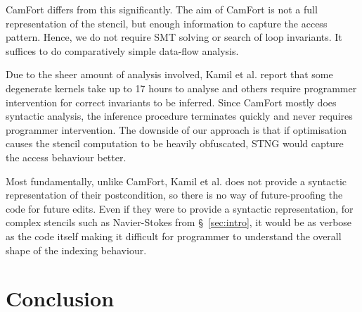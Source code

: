 \documentclass[10pt,preprint]{sigplanconf}
\theoremstyle{definition}
\begin{document}
CamFort differs from this significantly. The aim of CamFort is not a
full representation of the stencil, but enough information to capture the access
pattern. Hence, we do not require SMT solving or search of loop invariants. It
suffices to do comparatively simple data-flow analysis.

Due to the sheer amount of analysis involved, Kamil et al. report that some
degenerate kernels take up to 17 hours to analyse and others require programmer
intervention for correct invariants to be inferred. Since CamFort mostly does
syntactic analysis, the inference procedure terminates quickly and never requires programmer intervention. The downside of our
approach is that if optimisation causes the stencil computation to be heavily
obfuscated, \textsf{STNG} would capture the access behaviour better.

Most fundamentally, unlike CamFort, Kamil et al. does not provide a syntactic
representation of their postcondition, so there is no way of future-proofing the
code for future edits. Even if they were to provide a syntactic representation,
for complex stencils such as Navier-Stokes from \S~\ref{sec:intro}, it would be
as verbose as the code itself making it difficult for programmer to understand
the overall shape of the indexing behaviour.

\section{Conclusion}\label{sec:conclusion}


\end{document}
